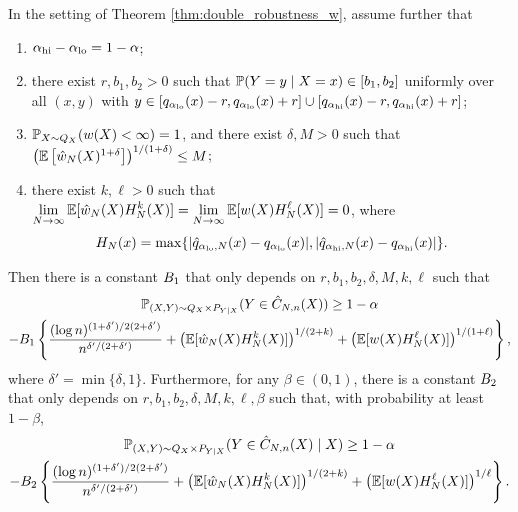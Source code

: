   \begin{theorem}\label{thm:double_robustness_q}
  In the setting of Theorem \ref{thm:double_robustness_w}, assume further that
    \begin{enumerate}[(1)]
    \item $\alpha_{\hi} - \alpha_{\lo} = 1 - \alpha$;
    \item there exist $r, b_{1}, b_{2} > 0$ such that $\P(Y = y \mid X = x) \in [b_{1}, b_{2}]$ uniformly over all $(x, y)$ with $y\in [q_{\alpha_{\lo}}(x) - r, q_{\alpha_{\lo}}(x) + r]\cup [q_{\alpha_{\hi}}(x) - r, q_{\alpha_{\hi}}(x) + r]$;
    \item $\P_{X\sim Q_{X}}(w(X) < \infty) = 1$, and there exist $\delta, M > 0$ such that $\lb\E\left[\hat{w}_{N}(X)^{1 + \delta}\right]\rb^{1 / (1 + \delta)} \le M$;
    \item there exist $k, \ell > 0$ such that $\displaystyle \lim_{N\rightarrow \infty} \E[\hat{w}_{N}(X)H_{N}^{k}(X)] = \lim_{N\rightarrow \infty} \E[w(X)H_{N}^{\ell}(X)] = 0$, where
      \[\displaystyle H_{N}(x) = \max\{|\hat{q}_{\alpha_{\lo}, N}(x) - q_{\alpha_{\lo}}(x)|, |\hat{q}_{\alpha_{\hi}, N}(x) - q_{\alpha_{\hi}}(x)|\}.\]
    \end{enumerate}
    Then there is a constant $\const_{1}$ that only depends on $r, b_1, b_2, \delta, M, k, \ell$ such that
    \begin{multline}
      \P_{(X, Y)\sim Q_{X}\times P_{Y\mid X}}(Y \in \hat{C}_{N, n}(X))\ge 1 - \alpha \\
       -\const_{1} \left\{\frac{(\log n)^{(1 + \delta') / 2(2 + \delta')}}{n^{\delta' / (2 + \delta')}} + \lb\E[\hat{w}_{N}(X)H_{N}^{k}(X)]\rb^{1 / (2+k)} + \lb\E[w(X)H_{N}^{\ell}(X)]\rb^{1/ (1+\ell)}\right\},\label{eq:unconditional_coverage_rate_q}
    \end{multline}
    where $\delta' = \min\{\delta, 1\}$. Furthermore, for any $\beta\in (0, 1)$, there is a constant $\const_{2}$ that only depends on $r, b_1, b_2, \delta, M, k, \ell, \beta$ such that, with probability at least $1 - \beta$, 
    \begin{multline}
      \P_{(X, Y)\sim Q_{X}\times P_{Y\mid X}}(Y \in \hat{C}_{N, n}(X) \mid X )\ge 1 - \alpha \\
       - \const_{2}\left\{\frac{(\log n)^{(1 + \delta') / 2(2 + \delta')}}{n^{\delta' / (2 + \delta')}} + \lb\E[\hat{w}_{N}(X)H_{N}^{k}(X)]\rb^{1 / (2+k)} + \lb\E[w(X)H_{N}^{\ell}(X)]\rb^{1/ \ell}\right\}.\label{eq:conditional_coverage_rate_q}
    \end{multline}
  \end{theorem}

